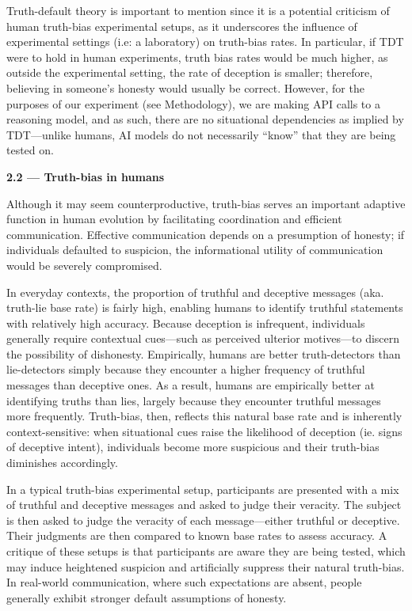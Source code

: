 \documentclass{article}
\begin{document}
Truth-default theory is important to mention since it is a potential criticism of human truth-bias experimental setups, as it underscores the influence of experimental settings (i.e: a laboratory) on truth-bias rates. In particular, if TDT were to hold in human experiments, truth bias rates would be much higher, as outside the experimental setting, the rate of deception is smaller; therefore, believing in someone's honesty would usually be correct. \citep{levine_truth-default_2014} However, for the purposes of our experiment (see Methodology), we are making API calls to a reasoning model, and as such, there are no situational dependencies as implied by TDT---unlike humans, AI models do not necessarily “know” that they are being tested on. \newline

\textbf{2.2 --- Truth-bias in humans}

Although it may seem counterproductive, truth-bias serves an important adaptive function in human evolution by facilitating coordination and efficient communication. Effective communication depends on a presumption of honesty; if individuals defaulted to suspicion, the informational utility of communication would be severely compromised.

In everyday contexts, the proportion of truthful and deceptive messages (aka. truth-lie base rate) is fairly high, enabling humans to identify truthful statements with relatively high accuracy. Because deception is infrequent, individuals generally require contextual cues—such as perceived ulterior motives—to discern the possibility of dishonesty. Empirically, humans are better truth-detectors than lie-detectors simply because they encounter a higher frequency of truthful messages than deceptive ones. As a result, humans are empirically better at identifying truths than lies, largely because they encounter truthful messages more frequently. Truth-bias, then, reflects this natural base rate and is inherently context-sensitive: when situational cues raise the likelihood of deception (ie. signs of deceptive intent), individuals become more suspicious and their truth-bias diminishes accordingly.

In a typical truth-bias experimental setup, participants are presented with a mix of truthful and deceptive messages and asked to judge their veracity. The subject is then asked to judge the veracity of each message—either truthful or deceptive. Their judgments are then compared to known base rates to assess accuracy. A critique of these setups is that participants are aware they are being tested, which may induce heightened suspicion and artificially suppress their natural truth-bias. In real-world communication, where such expectations are absent, people generally exhibit stronger default assumptions of honesty.
\end{document}
